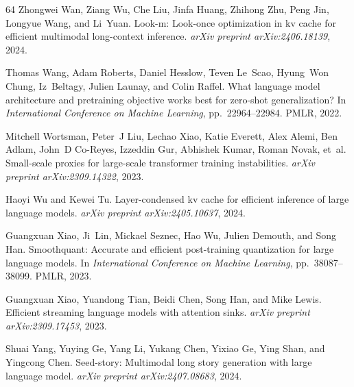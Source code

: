 \documentclass{article} \usepackage{iclr2025_conference,times}
\begin{document}
\begin{thebibliography}{64}
Zhongwei Wan, Ziang Wu, Che Liu, Jinfa Huang, Zhihong Zhu, Peng Jin, Longyue Wang, and Li~Yuan.
\newblock Look-m: Look-once optimization in kv cache for efficient multimodal long-context inference.
\newblock \emph{arXiv preprint arXiv:2406.18139}, 2024.

Thomas Wang, Adam Roberts, Daniel Hesslow, Teven Le~Scao, Hyung~Won Chung, Iz~Beltagy, Julien Launay, and Colin Raffel.
\newblock What language model architecture and pretraining objective works best for zero-shot generalization?
\newblock In \emph{International Conference on Machine Learning}, pp.\  22964--22984. PMLR, 2022.

Mitchell Wortsman, Peter~J Liu, Lechao Xiao, Katie Everett, Alex Alemi, Ben Adlam, John~D Co-Reyes, Izzeddin Gur, Abhishek Kumar, Roman Novak, et~al.
\newblock Small-scale proxies for large-scale transformer training instabilities.
\newblock \emph{arXiv preprint arXiv:2309.14322}, 2023.

Haoyi Wu and Kewei Tu.
\newblock Layer-condensed kv cache for efficient inference of large language models.
\newblock \emph{arXiv preprint arXiv:2405.10637}, 2024.

Guangxuan Xiao, Ji~Lin, Mickael Seznec, Hao Wu, Julien Demouth, and Song Han.
\newblock Smoothquant: Accurate and efficient post-training quantization for large language models.
\newblock In \emph{International Conference on Machine Learning}, pp.\  38087--38099. PMLR, 2023{}.

Guangxuan Xiao, Yuandong Tian, Beidi Chen, Song Han, and Mike Lewis.
\newblock Efficient streaming language models with attention sinks.
\newblock \emph{arXiv preprint arXiv:2309.17453}, 2023{}.

Shuai Yang, Yuying Ge, Yang Li, Yukang Chen, Yixiao Ge, Ying Shan, and Yingcong Chen.
\newblock Seed-story: Multimodal long story generation with large language model.
\newblock \emph{arXiv preprint arXiv:2407.08683}, 2024.


\end{thebibliography}
\end{document}
